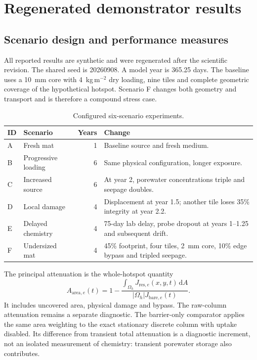 \section{Regenerated demonstrator results}
\label{sec:results}
\subsection{Scenario design and performance measures}
All reported results are synthetic and were regenerated after the scientific revision. The shared seed is 20260908. A model year is 365.25 days. The baseline uses a 10~mm core with 4~kg\,m$^{-2}$ dry loading, nine tiles and complete geometric coverage of the hypothetical hotspot. Scenario F changes both geometry and transport and is therefore a compound stress case.

\begin{table}[htbp]\centering\small
\caption{Configured six-scenario experiments.}\label{tab:scenarios}
\begin{tabular}{llrp{.48\linewidth}}\toprule
ID & Scenario & Years & Change \\
\midrule
A & Fresh mat & 1 & Baseline source and fresh medium. \\
B & Progressive loading & 6 & Same physical configuration, longer exposure. \\
C & Increased source & 6 & At year 2, porewater concentrations triple and seepage doubles. \\
D & Local damage & 4 & Displacement at year 1.5; another tile loses 35\% integrity at year 2.2. \\
E & Delayed chemistry & 4 & 75-day lab delay, probe dropout at years 1--1.25 and subsequent drift. \\
F & Undersized mat & 4 & 45\% footprint, four tiles, 2~mm core, 10\% edge bypass and tripled seepage. \\
\bottomrule\end{tabular}\end{table}

The principal attenuation is the whole-hotspot quantity
\begin{equation}
A_{\mathrm{area},e}(t)=1-\frac{\int_{\Omega_h}J_{\mathrm{res},e}(x,y,t)\,\mathrm{d}A}{|\Omega_h|J_{\mathrm{bare},e}(t)}.
\end{equation}
It includes uncovered area, physical damage and bypass. The raw-column attenuation remains a separate diagnostic. The barrier-only comparator applies the same area weighting to the exact stationary discrete column with uptake disabled. Its difference from transient total attenuation is a diagnostic increment, not an isolated measurement of chemistry: transient porewater storage also contributes.


